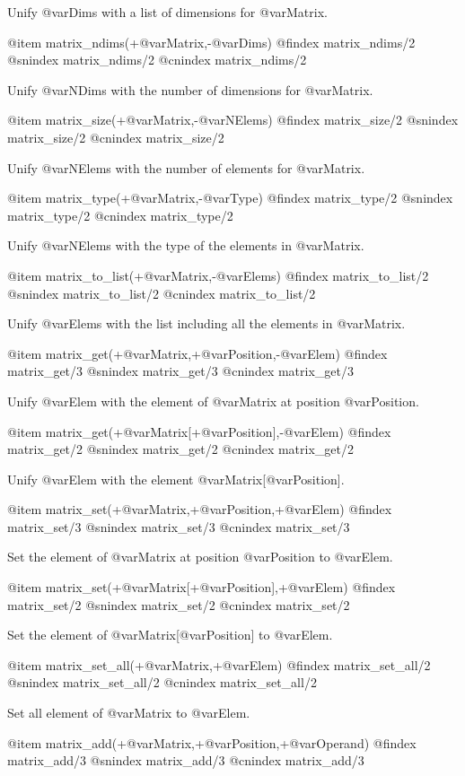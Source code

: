 Unify @var{Dims} with a list of dimensions for @var{Matrix}.

@item matrix_ndims(+@var{Matrix},-@var{Dims})
@findex matrix_ndims/2
@snindex matrix_ndims/2
@cnindex matrix_ndims/2

Unify @var{NDims} with the number of dimensions for @var{Matrix}.

@item matrix_size(+@var{Matrix},-@var{NElems})
@findex matrix_size/2
@snindex matrix_size/2
@cnindex matrix_size/2

Unify @var{NElems} with the number of elements for @var{Matrix}.

@item matrix_type(+@var{Matrix},-@var{Type})
@findex matrix_type/2
@snindex matrix_type/2
@cnindex matrix_type/2

Unify @var{NElems} with the type of the elements in @var{Matrix}.

@item matrix_to_list(+@var{Matrix},-@var{Elems})
@findex matrix_to_list/2
@snindex matrix_to_list/2
@cnindex matrix_to_list/2

Unify @var{Elems} with the list including all the elements in @var{Matrix}.

@item matrix_get(+@var{Matrix},+@var{Position},-@var{Elem})
@findex matrix_get/3
@snindex matrix_get/3
@cnindex matrix_get/3

Unify @var{Elem} with the element of @var{Matrix} at position
@var{Position}.

@item matrix_get(+@var{Matrix}[+@var{Position}],-@var{Elem})
@findex matrix_get/2
@snindex matrix_get/2
@cnindex matrix_get/2

Unify @var{Elem} with the element @var{Matrix}[@var{Position}].

@item matrix_set(+@var{Matrix},+@var{Position},+@var{Elem})
@findex matrix_set/3
@snindex matrix_set/3
@cnindex matrix_set/3

Set the element of @var{Matrix} at position
@var{Position} to  @var{Elem}.

@item matrix_set(+@var{Matrix}[+@var{Position}],+@var{Elem})
@findex matrix_set/2
@snindex matrix_set/2
@cnindex matrix_set/2

Set the element of @var{Matrix}[@var{Position}] to  @var{Elem}.

@item matrix_set_all(+@var{Matrix},+@var{Elem})
@findex matrix_set_all/2
@snindex matrix_set_all/2
@cnindex matrix_set_all/2

Set all element of @var{Matrix} to @var{Elem}.

@item matrix_add(+@var{Matrix},+@var{Position},+@var{Operand})
@findex matrix_add/3
@snindex matrix_add/3
@cnindex matrix_add/3

